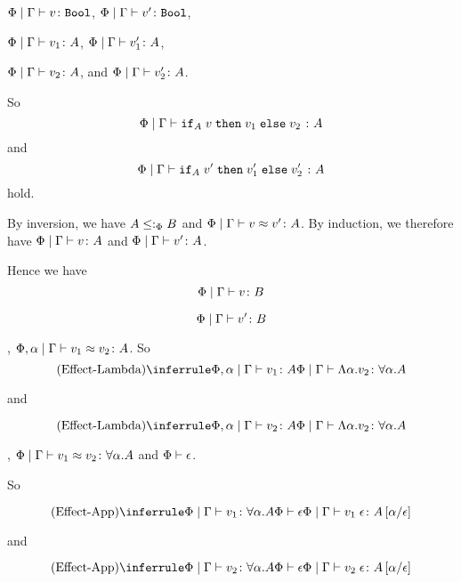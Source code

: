 {    $\Phi\mid\Gamma \vdash v \colon \texttt{Bool}$,
    $\Phi\mid\Gamma \vdash v' \colon \texttt{Bool}$,

    $\Phi\mid\Gamma \vdash v_1 \colon A$,
    $\Phi\mid\Gamma \vdash v_1' \colon A$,

    
    $\Phi\mid\Gamma \vdash v_2 \colon A$, and
    $\Phi\mid\Gamma \vdash v_2' \colon A$.

    So 
    \begin{equation}
        \Phi\mid\Gamma \vdash \texttt{if}_{A}\; v\; \texttt{then}\; v_1 \;\texttt{else} \; v_2\; \colon A
    \end{equation}
    and
    \begin{equation}
        \Phi\mid\Gamma \vdash \texttt{if}_{A}\; v'\; \texttt{then}\; v_1' \;\texttt{else} \; v_2'\; \colon A
    \end{equation}
    hold.

    By inversion, we have $A \leq:_\Phi B$ and $\Phi\mid\Gamma \vdash v \approx v' \colon A$. By induction, we therefore have $\Phi\mid\Gamma \vdash v \colon A$ and $\Phi\mid\Gamma \vdash v' \colon A$.

    Hence we have 
    \begin{equation}
        \Phi\mid\Gamma \vdash v \colon B
    \end{equation}

    
    \begin{equation}
        \Phi\mid\Gamma \vdash v' \colon B
    \end{equation}


    \bi, $\Phi,\alpha\mid\Gamma \vdash v_1 \approx v_2 \colon A$.
    So \begin{equation}
        \ntreeruleI{Effect-Lambda}{\etyperelation{\P,\a}{\G}{v_1}{A}}{\gpetyperelation{\elam{\a}{v_2}}{\all{\a}{A}}}
    \end{equation}

    and

    \begin{equation}
        \ntreeruleI{Effect-Lambda}{\etyperelation{\P,\a}{\G}{v_2}{A}}{\gpetyperelation{\elam{\a}{v_2}}{\all{\a}{A}}}
    \end{equation}



    \bi, $\Phi\mid\Gamma \vdash v_1 \approx v_2 \colon \forall \alpha. A$ and $\Phi\vdash \epsilon$.

    So 

    \begin{equation}
        \ntreeruleII{Effect-App}{\gpetyperelation{v_1}{\all{\a}{A}}}{\wellformed{\P}{\e}}{\gpetyperelation{\eapp{v_1}{\e}}{A\ssub{\e}{\a}}}
    \end{equation}

    and

    \begin{equation}
        \ntreeruleII{Effect-App}{\gpetyperelation{v_2}{\all{\a}{A}}}{\wellformed{\P}{\e}}{\gpetyperelation{\eapp{v_2}{\e}}{A\ssub{\e}{\a}}}
    \end{equation}
}   
    
\ifdefined\NoDocument
\else
\documentclass{report}





   \BetaEtaEquivalence

\fi